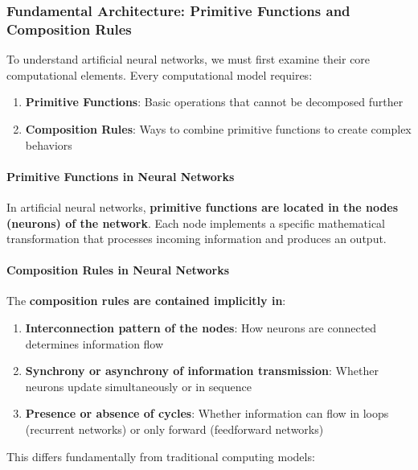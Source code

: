 \subsubsection{Fundamental Architecture: Primitive Functions and Composition Rules}
\label{subsubsec:fundamental-architecture}

To understand artificial neural networks, we must first examine their core computational elements. Every computational model requires:

\begin{enumerate}
\item \textbf{Primitive Functions}: Basic operations that cannot be decomposed further
\item \textbf{Composition Rules}: Ways to combine primitive functions to create complex behaviors
\end{enumerate}

\paragraph{Primitive Functions in Neural Networks}
\label{para:primitive-functions-nn}

In artificial neural networks, \textbf{primitive functions are located in the nodes (neurons) of the network}. Each node implements a specific mathematical transformation that processes incoming information and produces an output.

\paragraph{Composition Rules in Neural Networks}
\label{para:composition-rules-nn}

The \textbf{composition rules are contained implicitly in}:

\begin{enumerate}
\item \textbf{Interconnection pattern of the nodes}: How neurons are connected determines information flow
\item \textbf{Synchrony or asynchrony of information transmission}: Whether neurons update simultaneously or in sequence
\item \textbf{Presence or absence of cycles}: Whether information can flow in loops (recurrent networks) or only forward (feedforward networks)
\end{enumerate}

This differs fundamentally from traditional computing models:

